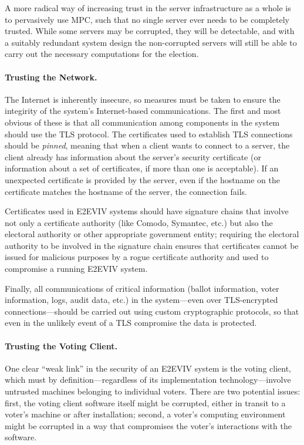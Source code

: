 A more radical way of increasing trust in the server infrastructure as
a whole is to pervasively use MPC, such that no single server ever
needs to be completely trusted. While some servers may be corrupted,
they will be detectable, and with a suitably redundant system design
the non-corrupted servers will still be able to carry out the
necessary computations for the election.

\paragraph{Trusting the Network.} The Internet is inherently insecure,
so measures must be taken to ensure the integirity of the system's
Internet-based communications. The first and most obvious of these is
that all communication among components in the system should use the
TLS protocol. The certificates used to establish TLS connections
should be \emph{pinned}, meaning that when a client wants to connect
to a server, the client already has information about the server's
security certificate (or information about a set of certificates, if
more than one is acceptable). If an unexpected certificate is provided
by the server, even if the hostname on the certificate matches the
hostname of the server, the connection fails.

Certificates used in E2EVIV systems should have signature chains that
involve not only a certificate authority (like Comodo, Symantec, etc.)
but also the electoral authority or other appropriate government
entity; requiring the electoral authority to be involved in the
signature chain ensures that certificates cannot be issued for
malicious purposes by a rogue certificate authority and used to
compromise a running E2EVIV system.

Finally, all communications of critical information (ballot
information, voter information, logs, audit data, etc.) in the
system---even over TLS-encrypted connections---should be carried out
using custom cryptographic protocols, so that even in the unlikely
event of a TLS compromise the data is protected.

\paragraph{Trusting the Voting Client.} One clear ``weak link'' in the
security of an E2EVIV system is the voting client, which must by
definition---regardless of its implementation technology---involve
untrusted machines belonging to individual voters. There are two
potential issues: first, the voting client software itself might be
corrupted, either in transit to a voter's machine or after
installation; second, a voter's computing environment might be
corrupted in a way that compromises the voter's interactions with the
software.

